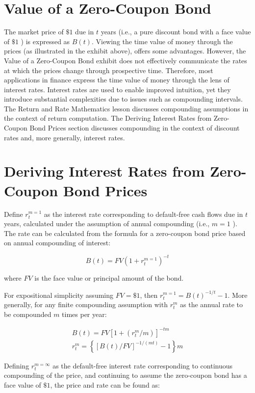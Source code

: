 \documentclass[11pt]{article}
\begin{document}
\section*{Value of a Zero-Coupon Bond}
The market price of $\$ 1$ due in $t$ years (i.e., a pure discount bond with a face value of $\$ 1$ ) is expressed as $B(t)$. Viewing the time value of money through the prices (as illustrated in the exhibit above), offers some advantages. However, the Value of a Zero-Coupon Bond exhibit does not effectively communicate the rates at which the prices change through prospective time. Therefore, most applications in finance express the time value of money through the lens of interest rates. Interest rates are used to enable improved intuition, yet they introduce substantial complexities due to issues such as compounding intervals. The Return and Rate Mathematics lesson discusses compounding assumptions in the context of return computation. The Deriving Interest Rates from Zero-Coupon Bond Prices section discusses compounding in the context of discount rates and, more generally, interest rates.

\section*{Deriving Interest Rates from Zero-Coupon Bond Prices}
Define $r_{t}^{m=1}$ as the interest rate corresponding to default-free cash flows due in $t$ years, calculated under the assumption of annual compounding (i.e., $m=1$ ). The rate can be calculated from the formula for a zero-coupon bond price based on annual compounding of interest:


\begin{equation*}
B(t)=F V\left(1+r_{t}^{m=1}\right)^{-t} \tag{1}
\end{equation*}


where $F V$ is the face value or principal amount of the bond.

For expositional simplicity assuming $F V=\$ 1$, then $r_{t}^{m=1}=B(t)^{-1 / t}-1$. More generally, for any finite compounding assumption with $r_{t}^{m}$ as the annual rate to be compounded $m$ times per year:


\begin{gather*}
B(t)=F V\left[1+\left(r_{t}^{m} / m\right)\right]^{-t m}  \tag{2}\\
r_{t}^{m}=\left\{[B(t) / F V]^{-1 /(m t)}-1\right\} m \tag{3}
\end{gather*}


Defining $r_{t}^{m=\infty}$ as the default-free interest rate corresponding to continuous compounding of the price, and continuing to assume the zero-coupon bond has a face value of $\$ 1$, the price and rate can be found as:
\end{document}
